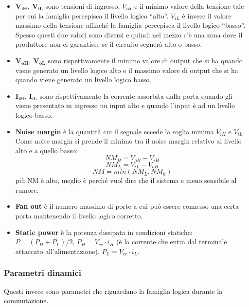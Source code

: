 \documentclass[
]{article}
\providecommand{\tightlist}{%
  \setlength{\itemsep}{0pt}\setlength{\parskip}{0pt}}
\begin{document}
\begin{itemize}
\tightlist
\item
  \(\mathbf{V_{iH}},\ \mathbf{V_{iL}}\) sono tensioni di ingresso,
  \(V_{iH}\) e il minimo valore della tensione tale per cui la famiglia
  percepisca il livello logico ``alto''. \(V_{iL}\) è invece il valore
  massimo della tensione affinché la famiglia percepisca il livello
  logico ``basso''. Spesso questi due valori sono diversi e quindi nel
  mezzo c'è una zona dove il produttore non ci garantisse se il circuito
  segnerà alto o basso.
\item
  \(\mathbf{V_{oH}},\ \mathbf{V_{oL}}\) sono rispettivamente il minimo
  valore di output che si ha quando viene generato un livello logico
  alto e il massimo valore di output che si ha quando viene generato un
  livello logico basso.
\item
  \(\mathbf{I_{iH}},\ \mathbf{I_{iL}}\) sono rispettivamente la corrente
  assorbita dalla porta quando gli viene presentato in ingresso un input
  alto e quando l'input è ad un livello logico basso.\\
\item
  \textbf{Noise margin} è la quantità cui il segnale eccede la soglia
  minima \(V_{iH}\) e \(V_{iL}\). Come noise margin si prende il minimo
  tra il noise margin relativo al livello alto e a quello basso:
  \[NM_{H} =V_{oH}-V_{iH}\] \[NM_{L} =V_{iL}-V_{oH}\]
  \[NM =min(NM_{L},NM_{h})\] più NM è alto, meglio è perché vuol dire
  che il sistema e meno sensibile al rumore.\\
\item
  \textbf{Fan out} è il numero massimo di porte a cui può essere
  connesso una certa porta mantenendo il livello logico corretto.\\
\item
  \textbf{Static power} è la potenza dissipata in condizioni statiche:
  \(P=(P_{H}+P_{L})/2\), \(P_{H}=V_{cc}\cdot i_{H}\) (è la corrente che
  entra dal terminale attaccato all'alimentazione),
  \(P_{L}=V_{cc}\cdot i_{L}\).
\end{itemize}

\subsubsection{Parametri dinamici}\label{parametri-dinamici}

Questi invece sono parametri che riguardano la famiglia logica durante
la commutazione.
\end{document}
